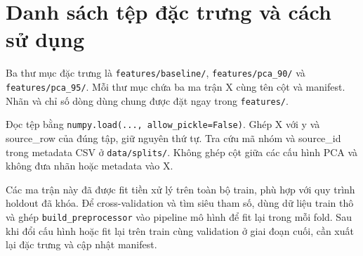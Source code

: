 \section{Danh sách tệp đặc trưng và cách sử dụng}
\label{sec:A_3}
Ba thư mục đặc trưng là \texttt{features/baseline/}, \texttt{features/pca\_90/} và \texttt{features/pca\_95/}. Mỗi thư mục chứa ba ma trận X cùng tên cột và manifest. Nhãn và chỉ số dòng dùng chung được đặt ngay trong \texttt{features/}.

Đọc tệp bằng \texttt{numpy.load(..., allow\_pickle=False)}. Ghép X với y và source\_row của đúng tập, giữ nguyên thứ tự. Tra cứu mã nhóm và source\_id trong metadata CSV ở \texttt{data/splits/}. Không ghép cột giữa các cấu hình PCA và không đưa nhãn hoặc metadata vào X.

Các ma trận này đã được fit tiền xử lý trên toàn bộ train, phù hợp với quy trình holdout đã khóa. Để cross-validation và tìm siêu tham số, dùng dữ liệu train thô và ghép \texttt{build\_preprocessor} vào pipeline mô hình để fit lại trong mỗi fold. Sau khi đổi cấu hình hoặc fit lại trên train cùng validation ở giai đoạn cuối, cần xuất lại đặc trưng và cập nhật manifest.
